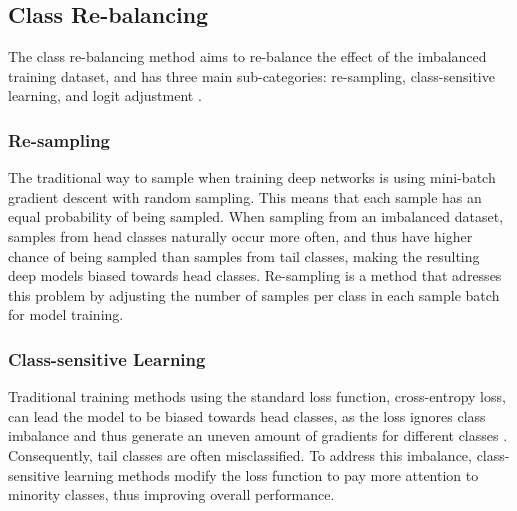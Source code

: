 \subsection{Class Re-balancing}
The class re-balancing method aims to re-balance the effect of the imbalanced training dataset, and has three main sub-categories: re-sampling, class-sensitive learning, and logit adjustment \cite{zhang2023deep}. 

\subsubsection{Re-sampling}
The traditional way to sample when training deep networks is using mini-batch gradient descent with random sampling. This means that each sample has an equal probability of being sampled. When sampling from an imbalanced dataset, samples from head classes naturally occur more often, and thus have higher chance of being sampled than samples from tail classes, making the resulting deep models biased towards head classes. Re-sampling is a method that adresses this problem by adjusting the number of samples per class in each sample batch for model training. 

\subsubsection{Class-sensitive Learning}


Traditional training methods using the standard loss function, cross-entropy loss, can lead the model to be biased towards head classes, as the loss ignores class imbalance and thus generate an uneven amount of gradients for different classes \cite{zhang2023deep}. Consequently, tail classes are often misclassified. To address this imbalance, class-sensitive learning methods modify the loss function to pay more attention to minority classes, thus improving overall performance.

